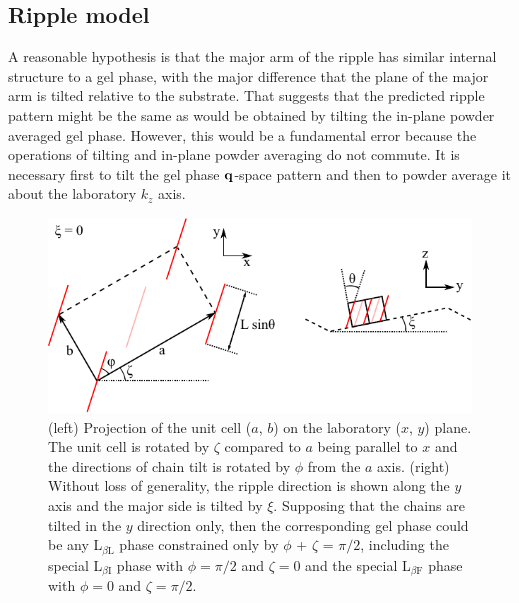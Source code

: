 \subsection{Ripple model}
A reasonable hypothesis is that the major arm of the ripple has similar 
internal structure to a gel phase, with the major   difference that the plane 
of the major arm is tilted relative to the substrate.  That suggests that the 
predicted ripple pattern might be the same as would be obtained by tilting the 
in-plane powder averaged gel phase.  However, this would be a fundamental error 
because the operations of tilting and in-plane powder averaging do not commute.  
It is necessary first to tilt the gel phase $\bold{q}$-space pattern and then to 
powder average it about the laboratory $k_z$ axis.  

\begin{figure}[htbp]
  \centering
  \includegraphics[width=\textwidth]{figures/ripple/thin_rod_model/unit_cell_combined}
  \caption[Thin rod model]{
  (left) Projection of the unit cell ($a$, $b$) on the laboratory ($x$, $y$) plane.  
  The unit cell is rotated by $\zeta$ compared to $a$ being parallel to $x$ and the 
  directions of chain tilt is rotated by $\phi$ from the $a$ axis. 
  (right) Without loss of generality, the ripple direction is shown along 
  the $y$ axis and the major side is tilted by $\xi$.  Supposing that the chains 
  are tilted in the $y$ direction only, then the corresponding gel phase could 
  be any L$_{\beta\text{L}}$ phase constrained only by 
  $\phi$ + $\zeta$ = $\pi/2$, including the 
  special L$_{\beta\text{I}}$ phase with $\phi=\pi/2$ and $\zeta=0$ and the 
  special L$_{\beta\text{F}}$ phase with $\phi=0$ and $\zeta=\pi/2$.}
  \label{fig:thin_rod_model}
\end{figure}

